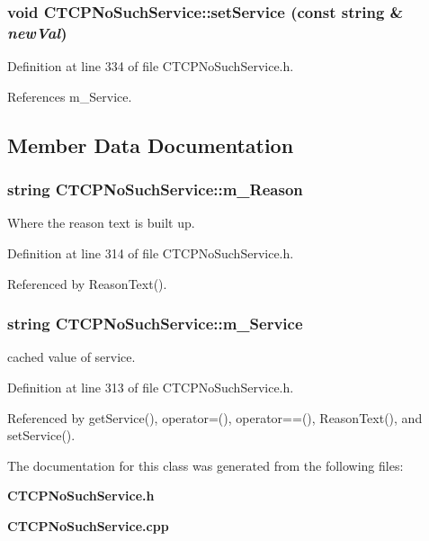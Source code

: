 \subsubsection{\setlength{\rightskip}{0pt plus 5cm}void CTCPNo\-Such\-Service::set\-Service (const string \& {\em new\-Val})\hspace{0.3cm}{\tt  [inline, protected]}}\label{classCTCPNoSuchService_b0}




Definition at line 334 of file CTCPNo\-Such\-Service.h.

References m\_\-Service.

\subsection{Member Data Documentation}
\subsubsection{\setlength{\rightskip}{0pt plus 5cm}string CTCPNo\-Such\-Service::m\_\-Reason\hspace{0.3cm}{\tt  [private]}}\label{classCTCPNoSuchService_o1}


Where the reason text is built up.



Definition at line 314 of file CTCPNo\-Such\-Service.h.

Referenced by Reason\-Text().
\subsubsection{\setlength{\rightskip}{0pt plus 5cm}string CTCPNo\-Such\-Service::m\_\-Service\hspace{0.3cm}{\tt  [private]}}\label{classCTCPNoSuchService_o0}


cached value of service.



Definition at line 313 of file CTCPNo\-Such\-Service.h.

Referenced by get\-Service(), operator=(), operator==(), Reason\-Text(), and set\-Service().

The documentation for this class was generated from the following files:\begin{CompactItemize}
\item 
{\bf CTCPNo\-Such\-Service.h}\item 
{\bf CTCPNo\-Such\-Service.cpp}\end{CompactItemize}
